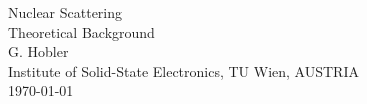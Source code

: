 %
\begin{center}
{
\vspace*{4cm}
%
\titlefont
Nuclear Scattering \\[1ex]
Theoretical Background \\[3cm]
%
\authorfont
G. Hobler \\[3cm]
}
%
Institute of Solid-State Electronics,
TU Wien, AUSTRIA \\[1ex]

%
\today
%
\end{center}
